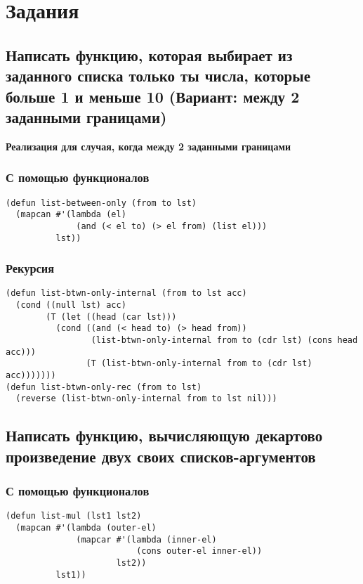\chapter{Задания}

\section{Написать функцию, которая выбирает из заданного списка только ты числа, которые больше 1 и меньше 10 (Вариант: между 2 заданными границами)}

\textbf{Реализация для случая, когда между 2 заданными границами}

\subsection{С помощью функционалов}

\begin{lstlisting}
(defun list-between-only (from to lst)
  (mapcan #'(lambda (el)
              (and (< el to) (> el from) (list el)))
          lst))
\end{lstlisting}

\subsection{Рекурсия}

\begin{lstlisting}
(defun list-btwn-only-internal (from to lst acc)
  (cond ((null lst) acc)
        (T (let ((head (car lst)))
          (cond ((and (< head to) (> head from)) 
                 (list-btwn-only-internal from to (cdr lst) (cons head acc)))
                (T (list-btwn-only-internal from to (cdr lst) acc)))))))
(defun list-btwn-only-rec (from to lst)
  (reverse (list-btwn-only-internal from to lst nil)))
\end{lstlisting}

\section{Написать функцию, вычисляющую декартово произведение двух своих списков-аргументов}

\subsection{С помощью функционалов}

\begin{lstlisting}
(defun list-mul (lst1 lst2)
  (mapcan #'(lambda (outer-el)
              (mapcar #'(lambda (inner-el)
                          (cons outer-el inner-el))
                      lst2))
          lst1))
\end{lstlisting}

